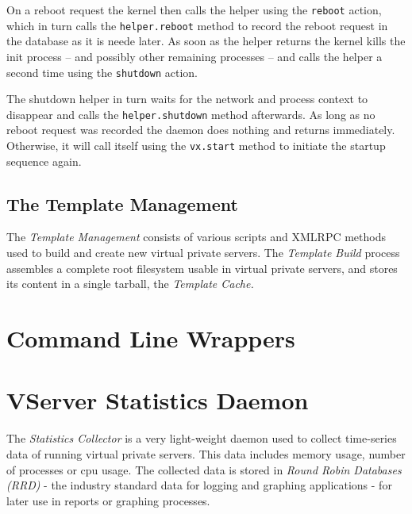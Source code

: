 On a reboot request the kernel then calls the helper using the \verb,reboot,
action, which in turn calls the \verb,helper.reboot, method to record the
reboot request in the database as it is neede later. As soon as the helper
returns the kernel kills the init process -- and possibly other remaining
processes -- and calls the helper a second time using the \verb,shutdown,
action.

The shutdown helper in turn waits for the network and process context to
disappear and calls the \verb,helper.shutdown, method afterwards. As long as no
reboot request was recorded the daemon does nothing and returns immediately.
Otherwise, it will call itself using the \verb,vx.start, method to initiate the
startup sequence again.


\subsection{The Template Management}

The \emph{Template Management} consists of various scripts and XMLRPC methods
used to build and create new virtual private servers. The \emph{Template Build}
process assembles a complete root filesystem usable in virtual private servers,
and stores its content in a single tarball, the \emph{Template Cache.}


\section{Command Line Wrappers}


\section{VServer Statistics Daemon}
\label{sec:intro:vcd:vstatd}

The \emph{Statistics Collector} is a very light-weight daemon used to collect
time-series data of running virtual private servers. This data includes memory
usage, number of processes or cpu usage. The collected data is stored in
\emph{Round Robin Databases (RRD)} - the industry standard data for logging and
graphing applications - for later use in reports or graphing processes.
